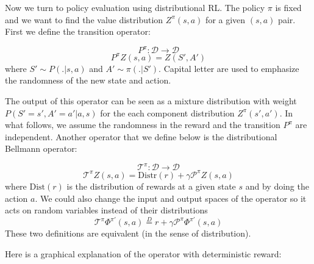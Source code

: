 \documentclass{article}
\begin{document}
Now we turn to policy evaluation using distributional RL. The policy $\pi$ is fixed and we want to find the value distribution $Z^\pi(s, a)$ for a given $(s,a)$ pair. First we define the transition operator:
\begin{defn}
\label{def:Transition Operator}
$$P^\pi:\mathcal{D}\rightarrow \mathcal{D}$$
\begin{equation}
    P^\pi Z(s, a) = Z(S', A') 
\end{equation}
where $S'\sim P(.|s, a)$ and $A'\sim \pi(.|S')$. Capital letter are used to emphasize the randomness of the new state and action.
\end{defn} 
The output of this operator can be seen as a mixture distribution with weight $P(S'=s', A'=a'|a, s)$ for the each component distribution $Z^\pi(s', a')$.
In what follows, we assume the randomness in the reward and the transition $P^\pi$ are independent. 
Another operator that we define below is the distributional Bellmann operator:
\begin{defn}
\label{def:Distributional Bellmann operator}
$$\mathcal{T}^\pi:\mathcal{D}\rightarrow \mathcal{D}$$
\begin{equation}
    \mathcal{T}^\pi Z(s, a) = \text{Distr}(r) + \gamma \mathcal{P}^\pi Z(s, a)
\end{equation}
where $\text{Dist}(r)$ is the distribution of rewards at a given state $s$ and by doing the action $a$.
We could also change the input and output spaces of the operator so it acts on random variables instead of their distributions
\begin{equation}
    \mathcal{T}^\pi \Phi^{\pi'}(s, a) \overset{D}{=} r + \gamma \mathcal{P}^\pi \Phi^{\pi'}(s, a)
\end{equation}
These two definitions are equivalent (in the sense of distribution).
\end{defn}
Here is a graphical explanation of the operator with deterministic reward:
\end{document}
